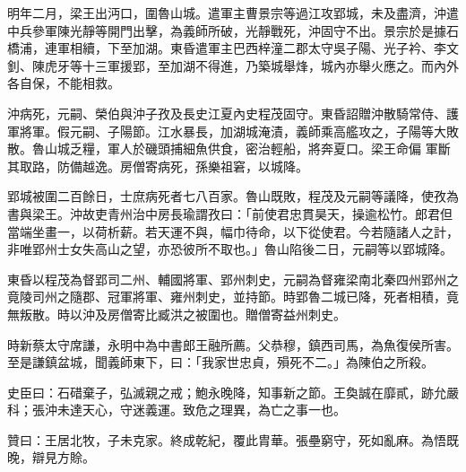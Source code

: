 \begin{pinyinscope}
 明年二月，梁王出沔口，圍魯山城。遣軍主曹景宗等過江攻郢城，未及盡濟，沖遣中兵參軍陳光靜等開門出擊，為義師所破，光靜戰死，沖固守不出。景宗於是據石橋浦，連軍相續，下至加湖。東昏遣軍主巴西梓潼二郡太守吳子陽、光子衿、李文釗、陳虎牙等十三軍援郢，至加湖不得進，乃築城舉烽，城內亦舉火應之。而內外各自保，不能相救。



 沖病死，元嗣、榮伯與沖子孜及長史江夏內史程茂固守。東昏詔贈沖散騎常侍、護軍將軍。假元嗣、子陽節。江水暴長，加湖城淹漬，義師乘高艦攻之，子陽等大敗散。魯山城乏糧，軍人於磯頭捕細魚供食，密治輕船，將奔夏口。梁王命偏
 軍斷其取路，防備越逸。房僧寄病死，孫樂祖窘，以城降。



 郢城被圍二百餘日，士庶病死者七八百家。魯山既敗，程茂及元嗣等議降，使孜為書與梁王。沖故吏青州治中房長瑜謂孜曰：「前使君忠貫昊天，操逾松竹。郎君但當端坐畫一，以荷析薪。若天運不與，幅巾待命，以下從使君。今若隨諸人之計，非唯郢州士女失高山之望，亦恐彼所不取也。」魯山陷後二日，元嗣等以郢城降。



 東昏以程茂為督郢司二州、輔國將軍、郢州刺史，元嗣為督雍梁南北秦四州郢州之竟陵司州之隨郡、冠軍將軍、雍州刺史，並持節。時郢魯二城已降，死者相積，竟無叛散。時以沖及房僧寄比臧洪之被圍也。贈僧寄益州刺史。



 時新蔡太守席謙，永明中為中書郎王融所薦。父恭穆，鎮西司馬，為魚復侯所害。至是謙鎮盆城，聞義師東下，曰：「我家世忠貞，殞死不二。」為陳伯之所殺。



 史臣曰：石碏棄子，弘滅親之戒；鮑永晚降，知事新之節。王奐誠在靡貳，跡允嚴科；張沖未達天心，守迷義運。致危之理異，為亡之事一也。



 贊曰：王居北牧，子未克家。終成乾紀，覆此胄華。張壘窮守，死如亂麻。為悟既晚，辯見方賒。



\end{pinyinscope}